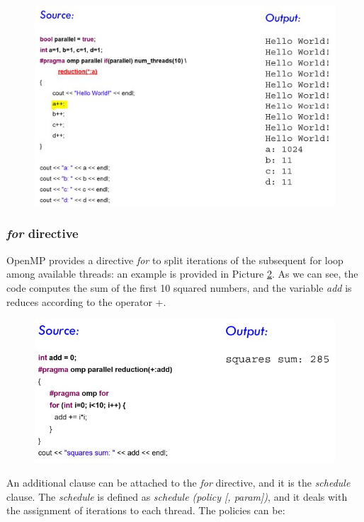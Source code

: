 \begin{figure}[h!]
		\centering
		\includegraphics[scale = 1.6]{img/reduction clauses.jpg}
        \label{reduction_clauses}
\end{figure}

\subsubsection{\textit{for} directive}
OpenMP provides a directive \textit{for} to split iterations of the subsequent for loop among available threads: an example is provided in Picture \ref{for_clause}. As we can see, the code computes the sum of the first 10 squared numbers, and the variable \textit{add} is reduces according to the operator +.

\begin{figure}[h!]
		\centering
		\includegraphics[scale = 1.6]{img/for clause.jpg}
        \label{for_clause}
\end{figure}

An additional clause can be attached to the \textit{for} directive, and it is the \textit{schedule} clause. The \textit{schedule}  is defined as \textit{schedule (policy [, param])}, and it deals with the assignment of iterations to each thread. The policies can be:

